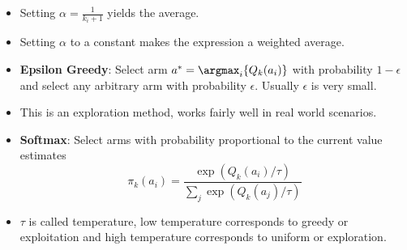 \documentclass[a4paper]{article}
\begin{document}
\begin{itemize}
    \item Setting $\alpha=\frac{1}{k_i+1}$ yields the average.
    \item Setting $\alpha$ to a constant makes the expression a weighted average.
    \item \textbf{Epsilon Greedy}: Select arm $a^*=\argmax_i\{Q_k(a_i)\}$ with probability $1-\epsilon$ and select any arbitrary arm with probability $\epsilon$. Usually $\epsilon$ is very small.
    \item This is an exploration method, works fairly well in real world scenarios.
    \item \textbf{Softmax}: Select arms with probability proportional to the current value estimates
    \begin{equation*}
        \pi_k(a_i)=\frac{\exp{(Q_k(a_i)/\tau)}}{\sum_j\exp{(Q_k(a_j)/\tau)}}
    \end{equation*}
    \item $\tau$ is called temperature, low temperature corresponds to greedy or exploitation and high temperature corresponds to uniform or exploration.
\end{itemize}
\end{document}
